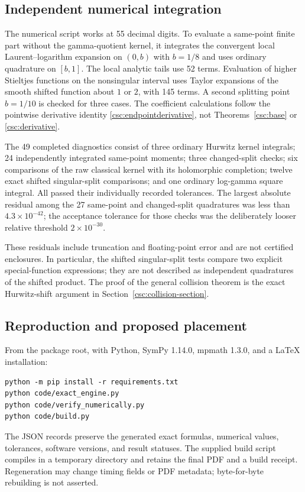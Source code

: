 \documentclass[11pt,a4paper]{article}
\numberwithin{equation}{section}
\theoremstyle{definition}
\begin{document}
\subsection{Independent numerical integration}
The numerical script works at 55 decimal digits. To evaluate a same-point finite part without the gamma-quotient kernel, it integrates the convergent local Laurent--logarithm expansion on $(0,b)$ with $b=1/8$ and uses ordinary quadrature on $[b,1]$. The local analytic tails use 52 terms. Evaluation of higher Stieltjes functions on the nonsingular interval uses Taylor expansions of the smooth shifted function about $1$ or $2$, with 145 terms. A second splitting point $b=1/10$ is checked for three cases. The coefficient calculations follow the pointwise derivative identity \eqref{csc:endpointderivative}, not Theorems~\ref{csc:base} or \ref{csc:derivative}.

The 49 completed diagnostics consist of three ordinary Hurwitz kernel integrals; 24 independently integrated same-point moments; three changed-split checks; six comparisons of the raw classical kernel with its holomorphic completion; twelve exact shifted singular-split comparisons; and one ordinary log-gamma square integral. All passed their individually recorded tolerances. The largest absolute residual among the 27 same-point and changed-split quadratures was less than $4.3\times10^{-42}$; the acceptance tolerance for those checks was the deliberately looser relative threshold $2\times10^{-30}$.

These residuals include truncation and floating-point error and are not certified enclosures. In particular, the shifted singular-split tests compare two explicit special-function expressions; they are not described as independent quadratures of the shifted product. The proof of the general collision theorem is the exact Hurwitz-shift argument in Section~\ref{csc:collision-section}.

\subsection{Reproduction and proposed placement}
From the package root, with Python, SymPy 1.14.0, mpmath 1.3.0, and a LaTeX installation:
\begin{verbatim}
python -m pip install -r requirements.txt
python code/exact_engine.py
python code/verify_numerically.py
python code/build.py
\end{verbatim}
The JSON records preserve the generated exact formulas, numerical values, tolerances, software versions, and result statuses. The supplied build script compiles in a temporary directory and retains the final PDF and a build receipt. Regeneration may change timing fields or PDF metadata; byte-for-byte rebuilding is not asserted.
\end{document}
